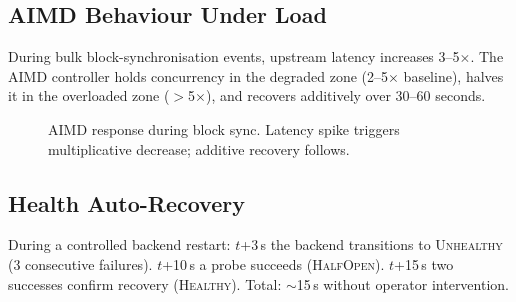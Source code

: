 \documentclass[a4paper, 11pt]{article}
\begin{document}
\subsection{AIMD Behaviour Under Load}
\label{sec:eval-aimd}

During bulk block-synchronisation events, upstream latency increases 3--5$\times$. The AIMD controller holds concurrency in the degraded zone (2--5$\times$ baseline), halves it in the overloaded zone ($>$5$\times$), and recovers additively over 30--60 seconds.

\begin{figure}[t]
\centering
{}
\caption{AIMD response during block sync. Latency spike triggers multiplicative decrease; additive recovery follows.}
\label{fig:aimd-response}
\end{figure}

\subsection{Health Auto-Recovery}
\label{sec:eval-health}

During a controlled backend restart: $t$+3\,s the backend transitions to \textsc{Unhealthy} (3 consecutive failures). $t$+10\,s a probe succeeds (\textsc{HalfOpen}). $t$+15\,s two successes confirm recovery (\textsc{Healthy}). Total: $\sim$15\,s without operator intervention.
\end{document}
